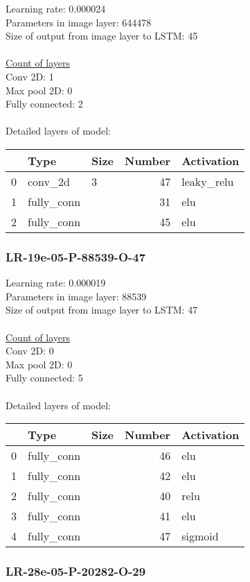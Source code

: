 Learning rate: 0.000024
\\Parameters in image layer: 644478
\\Size of output from image layer to LSTM: 45
\\\\\underline{Count of layers} 
\\Conv 2D:           1\\Max pool 2D:      0\\Fully connected:  2
\\\\Detailed layers of model: \\\begin{tabular}{rllrl}
\hline
    & Type       & Size   &   Number & Activation   \\
\hline
  0 & conv\_2d    & 3      &       47 & leaky\_relu   \\
  1 & fully\_conn &        &       31 & elu          \\
  2 & fully\_conn &        &       45 & elu          \\
\hline
\end{tabular}\subsubsection*{LR-19e-05-P-88539-O-47}
Learning rate: 0.000019
\\Parameters in image layer: 88539
\\Size of output from image layer to LSTM: 47
\\\\\underline{Count of layers} 
\\Conv 2D:           0\\Max pool 2D:      0\\Fully connected:  5
\\\\Detailed layers of model: \\\begin{tabular}{rllrl}
\hline
    & Type       & Size   &   Number & Activation   \\
\hline
  0 & fully\_conn &        &       46 & elu          \\
  1 & fully\_conn &        &       42 & elu          \\
  2 & fully\_conn &        &       40 & relu         \\
  3 & fully\_conn &        &       41 & elu          \\
  4 & fully\_conn &        &       47 & sigmoid      \\
\hline
\end{tabular}\subsubsection*{LR-28e-05-P-20282-O-29}
